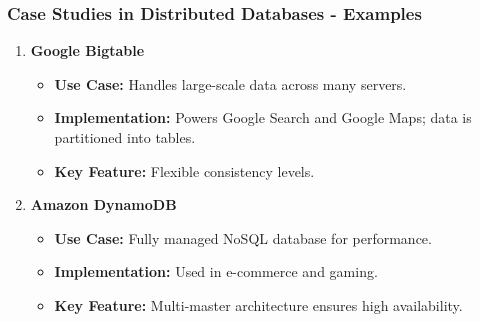 \documentclass[aspectratio=169]{beamer}
\begin{document}
\begin{frame}[fragile]
    \frametitle{Case Studies in Distributed Databases - Examples}
    \begin{enumerate}
        \item \textbf{Google Bigtable}
        \begin{itemize}
            \item \textbf{Use Case:} Handles large-scale data across many servers.
            \item \textbf{Implementation:} Powers Google Search and Google Maps; data is partitioned into tables.
            \item \textbf{Key Feature:} Flexible consistency levels.
        \end{itemize}

        \item \textbf{Amazon DynamoDB}
        \begin{itemize}
            \item \textbf{Use Case:} Fully managed NoSQL database for performance.
            \item \textbf{Implementation:} Used in e-commerce and gaming.
            \item \textbf{Key Feature:} Multi-master architecture ensures high availability.
        \end{itemize}
    \end{enumerate}
\end{frame}
\end{document}
